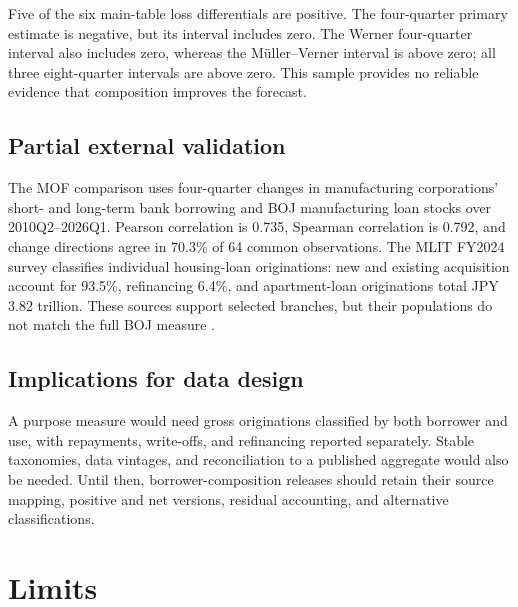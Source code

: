 \documentclass[11pt]{article}
\begin{document}
Five of the six main-table loss differentials are positive. The four-quarter
primary estimate is negative, but its interval includes zero. The Werner
four-quarter interval also includes zero, whereas the M\"uller--Verner interval
is above zero; all three eight-quarter intervals are above zero. This sample
provides no reliable evidence that composition improves the forecast.

\subsection{Partial external validation}


The MOF comparison uses four-quarter changes in manufacturing corporations'
short- and long-term bank borrowing and BOJ manufacturing loan stocks over
2010Q2--2026Q1. Pearson correlation is 0.735, Spearman correlation is 0.792,
and change directions agree in 70.3\% of 64 common observations. The MLIT
FY2024 survey classifies individual housing-loan originations: new and existing
acquisition account for 93.5\%, refinancing 6.4\%, and apartment-loan
originations total JPY 3.82 trillion. These sources support selected branches,
but their populations do not match the full BOJ measure
\citep{MOFCorporateStatistics,MLITHousingSurvey}.

\subsection{Implications for data design}

A purpose measure would need gross originations classified by both borrower
and use, with repayments, write-offs, and refinancing reported separately.
Stable taxonomies, data vintages, and reconciliation to a published aggregate
would also be needed. Until then, borrower-composition releases should retain
their source mapping, positive and net versions, residual accounting, and
alternative classifications.

\section{Limits}
\end{document}
